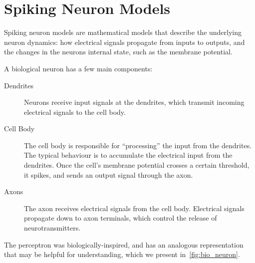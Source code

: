 \documentclass[fyp]{socreport}
\begin{document}
\section{Spiking Neuron Models\label{sec:spiking-neuron-model}}

Spiking neuron models are mathematical models that describe the underlying
neuron dynamics: how electrical signals propagate from inputs to outputs, and
the changes in the neurons internal state, such as the membrane potential.

A biological neuron has a few main components:

\begin{description}
  \item[{Dendrites}] Neurons receive input signals at the dendrites, which
    transmit incoming electrical signals to the cell body.
  \item[{Cell Body}] The cell body is responsible for ``processing'' the input
    from the dendrites. The typical behaviour is to accumulate the electrical
    input from the dendrites. Once the cell's membrane potential crosses a
    certain threshold, it spikes, and sends an output signal through the axon.
  \item[{Axons}] The axon receives electrical signals from the cell body.
    Electrical signals propagate down to axon terminals, which control the
    release of neurotransmitters.
\end{description}

The perceptron was biologically-inspired, and has an analogous representation
that may be helpful for understanding, which we present
in~\autoref{fig:bio_neuron}.
\end{document}
